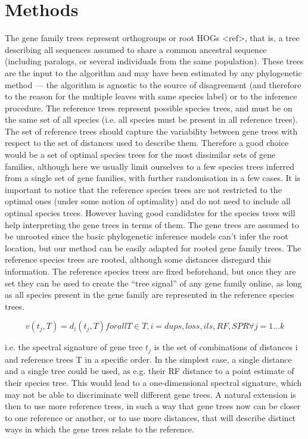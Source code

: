 \section{Methods}
The gene family trees represent orthogroups or root HOGs <ref>, that is, a tree describing all sequences assumed to
share a common ancestral sequence (including paralogs, or several individuals from the same population). These trees are
the input to the algorithm and may have been estimated by any phylogenetic method --- the algorithm is agnostic to the
source of disagreement (and therefore to the reason for the multiple leaves with same species label) or to the inference
procedure. The reference trees represent possible species trees, and must be on the same set of all species (i.e. all
species must be present in all reference trees). The set of reference trees should capture the variability between gene
trees with respect to the set of distances used to describe them. Therefore a good choice would be a set of optimal
species trees for the most dissimilar sets of gene families, although here we usually limit ourselves to a few species
trees inferred from a single set of gene families, with further randomisation in a few cases. It is important to notice
that the reference species trees are not restricted to the optimal ones (under some notion of optimality) and do not
need to include all optimal species trees. However having good candidates for the species trees will help interpreting
the gene trees in terms of them. The gene trees are assumed to be unrooted since the basic phylogenetic inference models
can’t infer the root location, but our method can be easily adapted for rooted gene family trees. The reference species
trees are rooted, although some distances disregard this information. The reference species trees are fixed beforehand,
but once they are set they can be used to create the “tree signal” of any gene family online, as long as all species
present in the gene family are represented in the reference species trees.

\begin{equation}
v(t_j,T) = {d_i(t_j, T) forall T \in T, i={dups, loss, ils, RF, SPR} } \forall j=1\dots k
\end{equation}


i.e. the spectral signature of gene tree $t_j$ is the set of combinations of distances i and reference trees T in a
specific order. In the simplest case, a single distance and a single tree could be used, as e.g. their RF distance to a
point estimate of their species tree. This would lead to a one-dimensional spectral signature, which may not be able to
discriminate well different gene trees. A natural extension is then to use more reference trees, in such a way that gene
trees now can be closer to one reference or another, or to use more distances, that will describe distinct ways in which
the gene trees relate to the reference.

